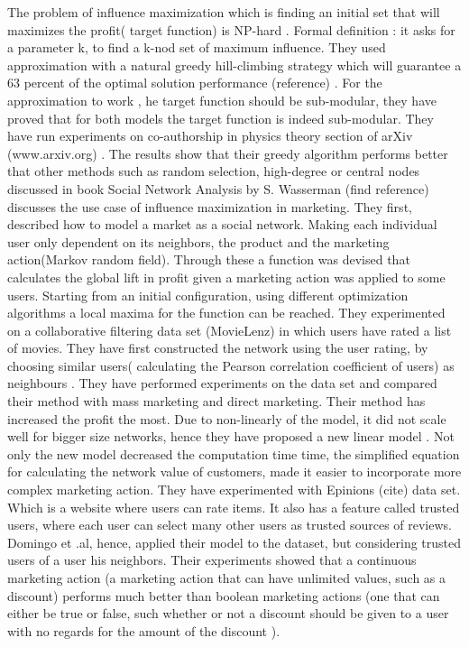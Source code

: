\documentclass[english]{tktltiki}
\begin{document}
The problem of influence maximization which is finding an initial set that will maximizes the profit( target function) is NP-hard . 
Formal definition : it asks for a parameter k, to find a k-nod set of maximum influence. They used approximation with a natural greedy hill-climbing strategy which will guarantee a 63 percent of the optimal solution performance (reference) . For the approximation to work , he target function should be sub-modular, they have proved that for both models the target function is indeed sub-modular.  They have run experiments on co-authorship in physics theory section of arXiv (www.arxiv.org) . The results show that their greedy algorithm performs better that other methods such as random selection, high-degree or central nodes discussed in book Social Network Analysis by S. Wasserman (find reference) \\
\cite{domingo01} discusses the use case of influence maximization in marketing. They first, described how to model a market as a social network. Making each individual user only dependent on its neighbors, the product and the marketing action(Markov random field). Through these a function was devised that calculates the global lift in profit given a marketing action was applied to some users. Starting from an initial configuration, using different optimization algorithms a local maxima for the function can be reached. 
They experimented on a collaborative filtering data set (MovieLenz) in which users have rated a list of movies. They have first constructed the network using the user rating, by choosing similar users( calculating the Pearson correlation coefficient of users) as neighbours . They have performed experiments on the data set and compared their method with mass marketing and direct marketing. Their method has increased the profit the most. Due to non-linearly of the model, it did not scale well for bigger size networks, hence they have proposed a new linear model \cite{domingo02}. Not only the new model decreased the computation time time, the simplified equation for calculating the network value of customers, made it easier to incorporate more complex marketing action. They have experimented with Epinions (cite) data set. Which is a website where users can rate items. It also has a feature called trusted users, where each user can select many other users as trusted sources of reviews. Domingo et .al, hence, applied their model to the dataset, but considering trusted users of a user his neighbors. Their experiments showed that a continuous marketing action (a marketing action that can have unlimited values, such as a discount) performs much better than boolean marketing actions (one that can either be true or false, such whether or not a discount should be given to a user with no regards for the amount of the discount ). 
\end{document}
